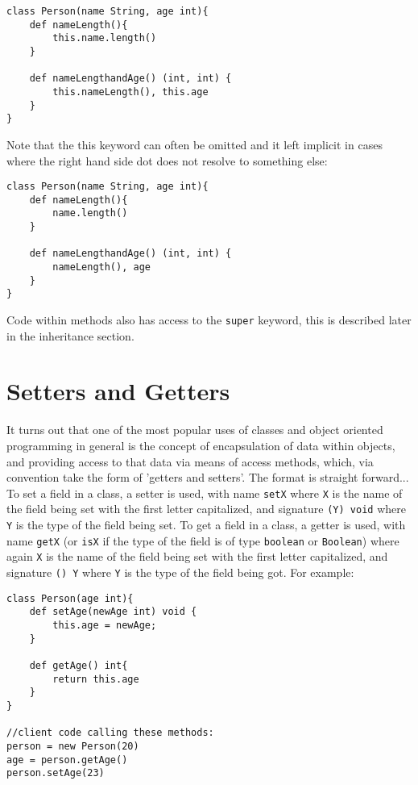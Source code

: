 \documentclass[conc-doc]{subfiles}
\begin{document}
\begin{lstlisting}
class Person(name String, age int){
	def nameLength(){
		this.name.length()
	}
	
	def nameLengthandAge() (int, int) {
		this.nameLength(), this.age
	}
}
\end{lstlisting}

Note that the this keyword can often be omitted and it left implicit in cases where the right hand side dot does not resolve to something else:

\begin{lstlisting}
class Person(name String, age int){
	def nameLength(){
		name.length()
	}
	
	def nameLengthandAge() (int, int) {
		nameLength(), age
	}
}
\end{lstlisting}

Code within methods also has access to the \lstinline{super} keyword, this is described later in the inheritance section.

\section{Setters and Getters}
\label{sec:setandget}
It turns out that one of the most popular uses of classes and object oriented programming in general is the concept of encapsulation of data within objects, and providing access to that data via means of access methods, which, via convention take the form of 'getters and setters'. The format is straight forward... To set a field in a class, a setter is used, with name \lstinline{setX} where \lstinline{X} is the name of the field being set with the first letter capitalized, and signature \lstinline{(Y) void} where \lstinline{Y} is the type of the field being set. To get a field in a class, a getter is used, with name \lstinline{getX} (or \lstinline{isX} if the type of the field is of type \lstinline{boolean} or \lstinline{Boolean}) where again \lstinline{X} is the name of the field being set with the first letter capitalized, and signature \lstinline{() Y} where \lstinline{Y} is the type of the field being got. For example:

\begin{lstlisting}
class Person(age int){
	def setAge(newAge int) void {
		this.age = newAge;
	}
	
	def getAge() int{
		return this.age
	}
}

//client code calling these methods:
person = new Person(20)
age = person.getAge()
person.setAge(23)
\end{lstlisting}
\end{document}
